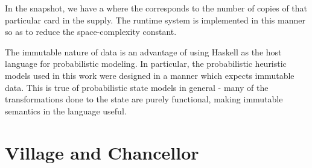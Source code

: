 In the snapshot, we have a  where
the  corresponds to the number of copies of
that particular card in the supply. The runtime system is implemented in
this manner so as to reduce the space-complexity constant.

The immutable nature of data is an advantage of using Haskell as the
host language for probabilistic modeling. In particular, the probabilistic
heuristic models used in this work were designed in a manner which expects
immutable data. This is true of probabilistic state models in general - many
of the transformations done to the state are purely functional, making
immutable semantics in the language useful.

\newpage

\section{Village and Chancellor} \label{app:dominion-card}

